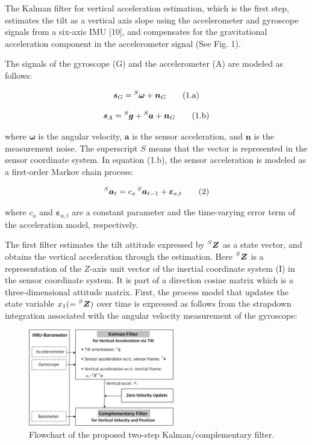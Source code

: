 \documentclass[10pt,journal,compsoc]{IEEEtran}
\begin{document}
The Kalman filter for vertical acceleration estimation, which is the first
step, estimates the tilt as a vertical axis slope using the accelerometer and
gyroscope signals from a six-axis IMU [10], and compensates for the
gravitational acceleration component in the accelerometer signal (See Fig. 1).

The signals of the gyroscope (G) and the accelerometer (A) are modeled as
follows:

\[\bm{s}_G = \prescript{S}{}{\bm{\omega}}+\bm{n}_G\tag{1.a}\]

\[\bm{s}_A = \prescript{S}{}{\bm{g}}+\prescript{S}{}{\bm{a}}+\bm{n}_G\tag{1.b}\]


\noindent where $\bm{\omega}$ is the angular velocity, $\bm{a}$ is the sensor
acceleration, and $\bm{n}$ is the measurement noise. The superscript $S$ 
means that the vector is represented in the sensor coordinate system. In
equation (1.b), the sensor acceleration is modeled as a first-order Markov
chain process:

\[\prescript{S}{}{\bm{a}_t} = c_a\prescript{S}{}{\bm{a}_{t-1}}+\bm{\varepsilon}_{a,t}\tag{2}\]

\noindent where $c_a$ and $\bm{\varepsilon}_{a,t}$ are a constant parameter and
the time-varying error term of the acceleration model, respectively.

The first filter estimates the tilt attitude expressed by
$\prescript{S}{}{\bm{Z}}$ as a state vector, and obtains the vertical
acceleration through the estimation. Here $\prescript{S}{}{\bm{Z}}$ is a
representation of the $Z$-axis unit vector of the inertial coordinate system (I) in
the sensor coordinate system.  It is part of a direction cosine matrix which is
a three-dimensional attitude matrix. First, the process model that updates the
state variable $x_1 (= \prescript{S}{}{\bm{Z}})$ over time is expressed as
follows from the strapdown integration associated with the angular velocity
measurement of the gyroscope:

\begin{figure}[!t]
\centering
\includegraphics[width=2.5in]{fig1}
    \caption{Flowchart of the proposed two-step Kalman/complementary filter.}
\label{fig1}
\end{figure}
\end{document}
